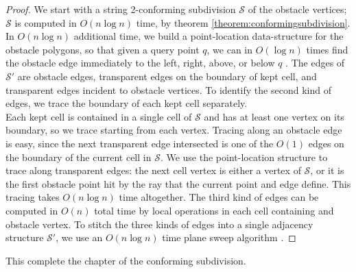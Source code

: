 \begin{proof}
We start with a string 2-conforming subdivision $\mathcal{S}$ of the obstacle vertices; $\mathcal{S}$ is computed in $O(n\log n)$ time, by theorem \ref{theorem:conformingsubdivision}. In $O(n\log n)$ additional time, we build a point-location data-structure for the obstacle polygons, so that given a query point $q$, we can in $O(\log n)$ times find the obstacle edge immediately to the left, right, above, or below $q$ \cite{EdelsbrunnerGS86}\cite{Kirkpatrick83}. The edges of $\mathcal{S}'$ are obstacle edges, transparent edges on the boundary of kept cell, and transparent edges incident to obstacle vertices. To identify the second kind of edges, we trace the boundary of each kept cell separately. \\

Each kept cell is contained in a single cell of $\mathcal{S}$ and has at least one vertex on its boundary, so we trace starting from each vertex. Tracing along an obstacle edge is easy, since the next transparent edge intersected is one of the $O(1)$ edges on the boundary of the current cell in $\mathcal{S}$. We use the point-location structure to trace along transparent edges: the next cell vertex is either a vertex of $\mathcal{S}$, or it is the first obstacle point hit by the ray that the current point and edge define. This tracing takes $O(n\log n)$ time altogether. The third kind of edges can be computed in $O(n)$ total time by local operations in each cell containing and obstacle vertex. To stitch the three kinds of edges into a single adjacency structure $\mathcal{S}'$, we use an $O(n \log n)$ time plane sweep algorithm \cite{CompGeo}.
\end{proof}

This complete the chapter of the conforming subdivision. 